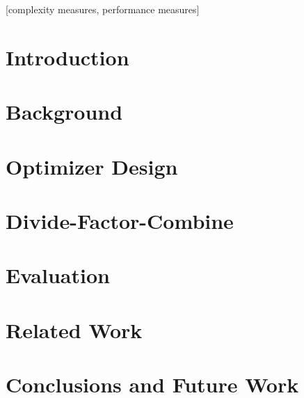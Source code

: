 \documentclass{acm_proc_article-sp}
\begin{document}
\maketitle
\begin{abstract}

\end{abstract}

[complexity measures, performance measures]



\section{Introduction}


\section{Background}


\section{Optimizer Design}


\section{Divide-Factor-Combine}


\section{Evaluation}


\section{Related Work}


\section{Conclusions and Future Work}


\end{document}
